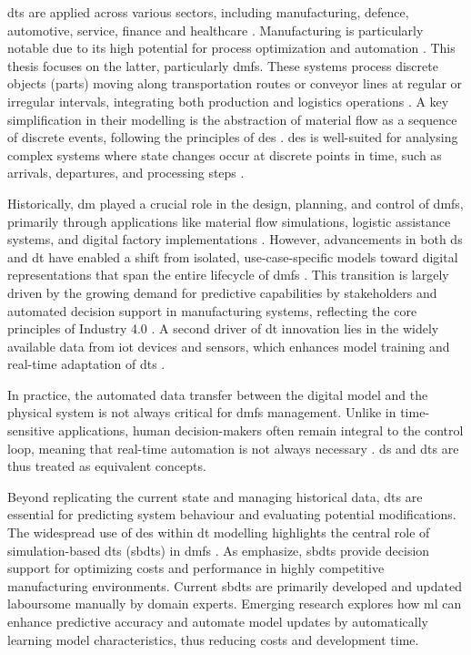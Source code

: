 \gls{dt}s are applied across various sectors, including manufacturing, defence, automotive, service, finance and healthcare \autocite{Tao2018ijamt}. Manufacturing is particularly notable due to its high potential for process optimization and automation \autocite{Tao2018ijamt}. This thesis focuses on the latter, particularly \gls{dmfs}. These systems process discrete objects (parts) moving along transportation routes or conveyor lines at regular or irregular intervals, integrating both production and logistics operations \autocite{arnold2005materialfluss, schwede2024learning}. A key simplification in their modelling is the abstraction of material flow as a sequence of discrete events, following the principles of \gls{des} \autocite{kovacs2016mathematical, robinson2014simulation}. \gls{des} is well-suited for analysing complex systems where state changes occur at discrete points in time, such as arrivals, departures, and processing steps \autocite{robinson2014simulation}.

Historically, \gls{dm} played a crucial role in the design, planning, and control of \gls{dmfs}, primarily through applications like material flow simulations, logistic assistance systems, and digital factory implementations \autocite{Thiede2013}. However, advancements in both \gls{ds} and \gls{dt} have enabled a shift from isolated, use-case-specific models toward digital representations that span the entire lifecycle of \gls{dmfs} \autocite{Abdoune2023}. This transition is largely driven by the growing demand for predictive capabilities by stakeholders and automated decision support in manufacturing systems,
reflecting the core principles of Industry 4.0 \autocite{frank2019industry}. A second driver of \gls{dt} innovation lies in the widely available data from \gls{iot} devices and sensors, which enhances model training and real-time adaptation of \gls{dt}s \autocite{Tao2018ijamt}.

In practice, the automated data transfer between the digital model and the physical system is not always critical for \gls{dmfs} management. Unlike in time-sensitive applications, human decision-makers often remain integral to the control loop, meaning that real-time automation is not always necessary \autocite{schwede2024learning}. \gls{ds} and \gls{dt}s are thus treated as equivalent concepts.

Beyond replicating the current state and managing historical data, \gls{dt}s are essential for predicting system behaviour and evaluating potential modifications. The widespread use of \gls{des} within \gls{dt} modelling highlights the central role of simulation-based \gls{dt}s (\gls{sbdt}s) in \gls{dmfs} \autocite{Lugaresi2021aifac}. As \textcite{schwede2024learning} emphasize, \gls{sbdt}s provide decision support for optimizing costs and performance in highly competitive manufacturing environments. Current \gls{sbdt}s are primarily developed and updated laboursome manually by domain experts. Emerging research explores how \gls{ml} can enhance predictive accuracy and automate model updates by automatically learning model characteristics, thus reducing costs and development time.

